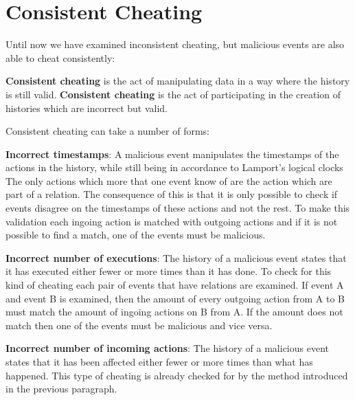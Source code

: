 	\section{Consistent Cheating}
	Until now we have examined inconsistent cheating, but malicious events are also able to cheat consistently:
	\begin{definition}
		\textbf{Consistent cheating} is the act of manipulating data in a way where the history is still valid.
		\textbf{Consistent cheating} is the act of participating in the creation of histories which are incorrect but valid.
	\end{definition}
	
	\newpar Consistent cheating can take a number of forms:

	\newpar \textbf{Incorrect timestamps}: A malicious event manipulates the timestamps of the actions in the history, while still being in accordance to Lamport's logical clocks
	The only actions which more that one event know of are the action which are part of a relation. The consequence of this is that it is only possible to check if events disagree on the timestamps of these actions and not the rest. To make this validation each ingoing action is matched with outgoing actions and if it is not possible to find a match, one of the events must be malicious. 
	
	\newpar \textbf{Incorrect number of executions}: The history of a malicious event states that it has executed either fewer or more times than it has done.
	To check for this kind of cheating each pair of events that have relations are examined. If event A and event B is examined, then the amount of every outgoing action from A to B must match the amount of ingoing actions on B from A. If the amount does not match then one of the events must be malicious and vice versa.
	
	\newpar \textbf{Incorrect number of incoming actions}: The history of a malicious event states that it has been affected either fewer or more times than what has happened.
	This type of cheating is already checked for by the method introduced in the previous paragraph.
	
